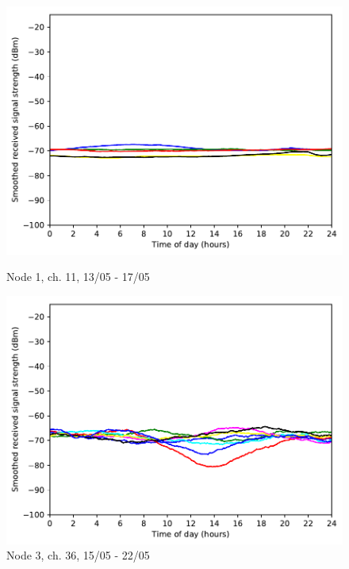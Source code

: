 \documentclass[a4paper, 11pt]{article}
\begin{document}
\begin{figure}
\begin{minipage}{0.47\textwidth}
	\includegraphics[width=\textwidth]{images/2_4_GHz/node1_2017-05-17_chan11_image}
    \caption{Node 1, ch. 11, 13/05 - 17/05} \label{node1-11}
\end{minipage}\hfill
\begin{minipage}{0.47\textwidth}
\centering
\includegraphics[width=\textwidth]{images/5_GHz/cot-node3-student_2017-05-22_chan36_image.pdf}
\caption{Node 3, ch. 36, 15/05 - 22/05}
\label{cot3_5ghz_pattern_chan36}
\end{minipage}\hfill
\end{figure}
\end{document}
